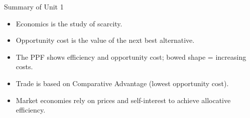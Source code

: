 \documentclass{beamer}
\begin{document}
\begin{frame}{Summary of Unit 1}
    \begin{itemize}
        \item Economics is the study of scarcity.
        \item Opportunity cost is the value of the next best alternative.
        \item The PPF shows efficiency and opportunity cost; bowed shape = increasing costs.
        \item Trade is based on Comparative Advantage (lowest opportunity cost).
        \item Market economies rely on prices and self-interest to achieve allocative efficiency.
    \end{itemize}
\end{frame}
\end{document}
